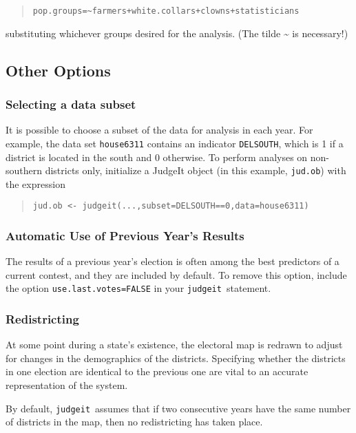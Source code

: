 \documentclass[oneside,letterpaper,titlepage]{article}
\newcommand{\jud}{\texttt{judgeit}\ }
\begin{document}
\begin{quote}
\texttt{pop.groups=\~{}farmers+white.collars+clowns+statisticians}
\end{quote}

substituting whichever groups desired for the analysis. (The tilde \~{} is necessary!)

\subsection*{Other Options}

\subsubsection*{Selecting a data subset}

It is possible to choose a subset of the data for analysis in each year. For example, the data set \texttt{house6311} contains an indicator \texttt{DELSOUTH}, which is 1 if a district is located in the south and 0 otherwise.  To perform analyses on non-southern districts only, initialize a JudgeIt object (in this example, \texttt{jud.ob}) with the expression

\begin{quote}
\texttt{jud.ob <- judgeit(...,subset=DELSOUTH==0,data=house6311)}
\end{quote}

\subsubsection*{Automatic Use of Previous Year's Results}

The results of a previous year's election is often among the best predictors of a current contest, and they are included by default. To remove this option, include the option \texttt{use.last.votes=FALSE} in your \jud statement.

\subsubsection*{Redistricting}

At some point during a state's existence, the electoral map is redrawn to adjust for changes in the demographics of the districts. Specifying whether the districts in one election are identical to the previous one are vital to an accurate representation of the system.

By default, \jud assumes that if two consecutive years have the same number of districts in the map, then no redistricting has taken place.
\end{document}
